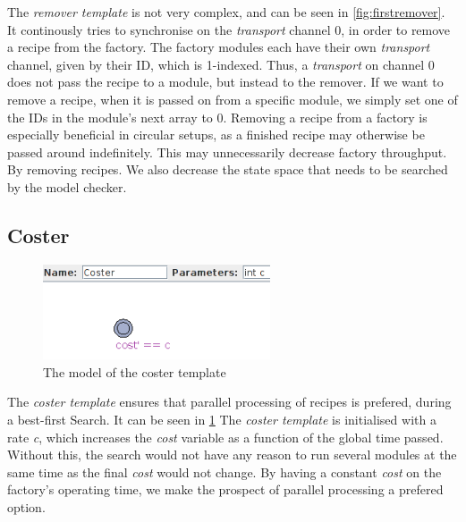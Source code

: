 The \emph{remover template} is not very complex, and can be seen in \cref{fig:firstremover}. It continously tries to synchronise on the \emph{transport} channel 0, in order to remove a recipe from the factory. The factory modules each have their own \emph{transport} channel, given by their ID, which is 1-indexed. Thus, a \emph{transport} on channel 0 does not pass the recipe to a module, but instead to the remover. If we want to remove a recipe, when it is passed on from a specific module, we simply set one of the IDs in the module’s next array to 0. Removing a recipe from a factory is especially beneficial in circular setups, as a finished recipe may otherwise be passed around indefinitely. This may unnecessarily decrease factory throughput. By removing recipes. We also decrease the state space that needs to be searched by the model checker.

\subsection{Coster}
\label{subs:coster}

\begin{figure}[h]
\centering
\includegraphics[width=0.6\textwidth]{images/firstcoster.png}
\caption{The model of the coster template}
\label{fig:firstcoster}
\end{figure}

The \emph{coster template} ensures that parallel processing of recipes is prefered, during a best-first Search. It can be seen in \cref{fig:firstcoster} The \emph{coster template} is initialised with a rate \emph{c}, which increases the \emph{cost} variable as a function of the global time passed. Without this, the search would not have any reason to run several modules at the same time as the final \emph{cost} would not change. By having a constant \emph{cost} on the factory’s operating time, we make the prospect of parallel processing a prefered option.
